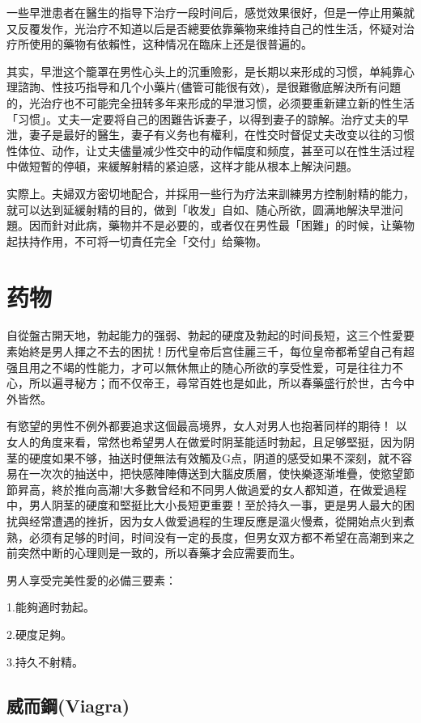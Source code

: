 \documentclass[12pt,UTF8]{ctexbook}
\begin{document}
一些早泄患者在醫生的指导下治疗一段时间后，感觉效果很好，但是一停止用藥就又反覆发作，光治疗不知道以后是否總要依靠藥物来维持自己的性生活，怀疑对治疗所使用的藥物有依賴性，这种情况在臨床上还是很普遍的。

其实，早泄这个籠罩在男性心头上的沉重險影，是长期以来形成的习惯，单純靠心理諮詢、性技巧指导和几个小藥片(儘管可能很有效)，是很難徹底解決所有问題的，光治疗也不可能完全扭转多年来形成的早泄习惯，必须要重新建立新的性生活「习惯」。丈夫一定要将自己的困難告诉妻子，以得到妻子的諒解。治疗丈夫的早泄，妻子是最好的醫生，妻子有义务也有權利，在性交时督促丈夫改变以往的习惯性体位、动作，让丈夫儘量减少性交中的动作幅度和频度，甚至可以在性生活过程中做短暫的停頓，来緩解射精的紧迫感，这样才能从根本上解決问題。

实際上。夫婦双方密切地配合，并採用一些行为疗法来訓練男方控制射精的能力，就可以达到延緩射精的目的，做到「收发」自如、随心所欲，圆满地解決早泄问題。因而針对此病，藥物并不是必要的，或者仅在男性最「困難」的时候，让藥物起扶持作用，不可将一切責任完全「交付」给藥物。

\chapter{药物}

自從盤古開天地，勃起能力的强弱、勃起的硬度及勃起的时间長短，这三个性愛要素始終是男人揮之不去的困扰！历代皇帝后宫佳麗三千，每位皇帝都希望自己有超强且用之不竭的性能力，才可以無休無止的随心所欲的享受性爱，可是往往力不心，所以遍寻秘方；而不仅帝王，尋常百姓也是如此，所以春藥盛行於世，古今中外皆然。

有慾望的男性不例外都要追求这個最高境界，女人对男人也抱著同样的期待！
以女人的角度来看，常然也希望男人在做爱时阴茎能适时勃起，且足够堅挺，因为阴茎的硬度如果不够，抽送时便無法有效觸及G点，阴道的感受如果不深刻，就不容易在一次次的抽送中，把快感陣陣傳送到大腦皮质層，使快樂逐渐堆疊，使慾望節節昇高，終於推向高潮!大多數曾经和不同男人做過爱的女人都知道，在做爱過程中，男人阴茎的硬度和堅挺比大小長短更重要！至於持久一事，更是男人最大的困扰與经常遭遇的挫折，因为女人做爱過程的生理反應是溫火慢煮，從開始点火到煮熟，必须有足够的时间，时间没有一定的長度，但男女双方都不希望在高潮到来之前突然中断的心理则是一致的，所以春藥才会应需要而生。

男人享受完美性愛的必備三要素：

1.能夠適时勃起。

2.硬度足夠。

3.持久不射精。

\section{威而鋼(Viagra)}
\end{document}
